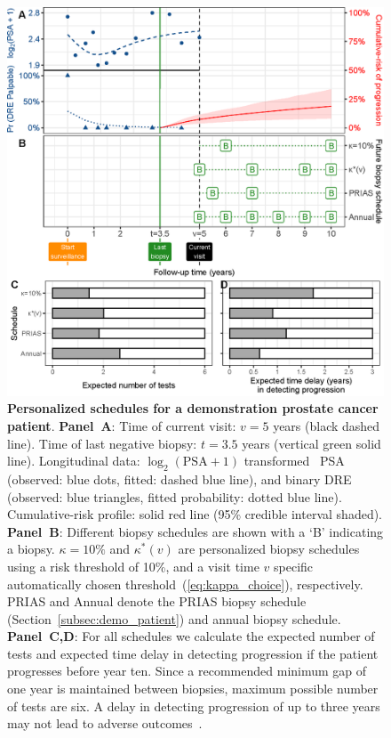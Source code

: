 \documentclass[useAMS, usenatbib, referee]{biom}
\begin{document}
\begin{figure}
\centerline{\includegraphics{demo_schedule.eps}}
\caption{\textbf{Personalized schedules for a demonstration prostate cancer patient}. \textbf{Panel~A}: Time of current visit: $v=5$ years (black dashed line). Time of last negative biopsy: $t=3.5$ years (vertical green solid line). Longitudinal data: $\log_2(\mbox{PSA} + 1)$ transformed~\citep{tomer2019personalized} PSA (observed: blue dots, fitted: dashed blue line), and binary DRE (observed: blue triangles, fitted probability: dotted blue line). Cumulative-risk profile: solid red line (95\% credible interval shaded). \textbf{Panel~B}: Different biopsy schedules are shown with a `B' indicating a biopsy. \textbf{$\kappa=10\%$} and \textbf{$\kappa^*(v)$} are personalized biopsy schedules using a risk threshold of 10\%, and a visit time $v$ specific automatically chosen threshold~(\ref{eq:kappa_choice}), respectively. PRIAS and Annual denote the PRIAS biopsy schedule (Section~\ref{subsec:demo_patient}) and annual biopsy schedule. \textbf{Panel~C,D}: For all schedules we calculate the expected number of tests and expected time delay in detecting progression if the patient progresses before year ten. Since a recommended minimum gap of one year is maintained between biopsies, maximum possible number of tests are six. A delay in detecting progression of up to three years may not lead to adverse outcomes~\citep{carvalho}. }
\label{fig:demo_schedule}
\end{figure}
\end{document}
